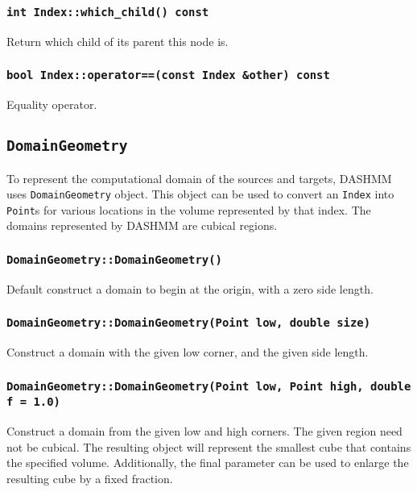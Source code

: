 \subsubsection{\texttt{int Index::which\_child() const}}

Return which child of its parent this node is.

\subsubsection{\texttt{bool Index::operator==(const Index \&other) const}}

Equality operator.


\subsection{\texttt{DomainGeometry}}

To represent the computational domain of the sources and targets, DASHMM
uses \texttt{DomainGeometry} object. This object can be used to convert
an \texttt{Index} into \texttt{Point}s for various locations in the volume
represented by that index. The domains represented by DASHMM are cubical
regions.

\subsubsection{\texttt{DomainGeometry::DomainGeometry()}}

Default construct a domain to begin at the origin, with a zero side length.

\subsubsection{\texttt{DomainGeometry::DomainGeometry(Point low, double size)}}

Construct a domain with the given low corner, and the given side length.

\subsubsection{\texttt{DomainGeometry::DomainGeometry(Point low, Point high, double f = 1.0)}}

Construct a domain from the given low and high corners. The given region need
not be cubical. The resulting object will represent the smallest cube that
contains the specified volume. Additionally, the final parameter can be used
to enlarge the resulting cube by a fixed fraction.

